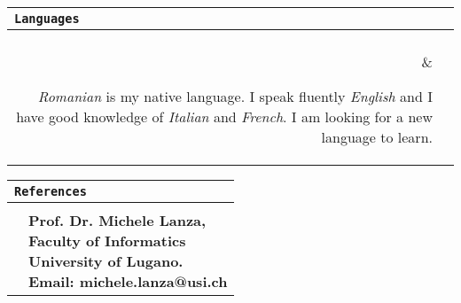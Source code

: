 \documentclass{article}
\newcommand{\cvsectionname}[1]{\multicolumn{2}{l}{\Large \tt #1}\\\hline\\}
\newenvironment{cvsection}[1]{\medskip \begin{tabular}{rl} \cvsectionname{#1}}{\end{tabular}}
\newcommand{\cvlanguageline}[2]{\parbox[t]{2.48cm}{\sl #1} & \parbox[t]{14cm}{ #2 \hfill}\\\vspace{4pt}}
\newcommand{\cvreferenceline}[2]{& \parbox[t]{16cm}{
\bf #1, \rm #2}\\\vspace{4pt}}
\begin{document}
\begin{cvsection}{Languages} 
\cvlanguageline{\hspace{1cm}}{{\em Romanian} is my native language. I speak fluently {\em English} and I have good knowledge of {\em Italian} and {\em French}. I am looking for a new language to learn.}
\end{cvsection}
\vspace{1cm}

%

\begin{cvsection}{References}
\cvreferenceline{Prof. Dr. Michele Lanza}{\\Faculty of Informatics\\
University of Lugano. 
\\Email: michele.lanza@usi.ch\\}
\cvreferenceline{Prof. Dr. Radu Marinescu}{\\Faculty of Automation and Computer Science\\ ``Politehnica'' University of Timi\c{s}oara. 
\\Email: radum@cs.utt.ro\\}
\cvreferenceline{Dr. Wim de Pauw}{\\IBM T.J. Watson Research Center. 
\\Email: wim@us.ibm.ch\\}

\cvreferenceline{Dipl. Ing. Calin Sircuta}{\\Computervoice Systems, Romania. 
\\Email: sircux@computervoice.ro\\}
	
\end{cvsection}
\end{document}
